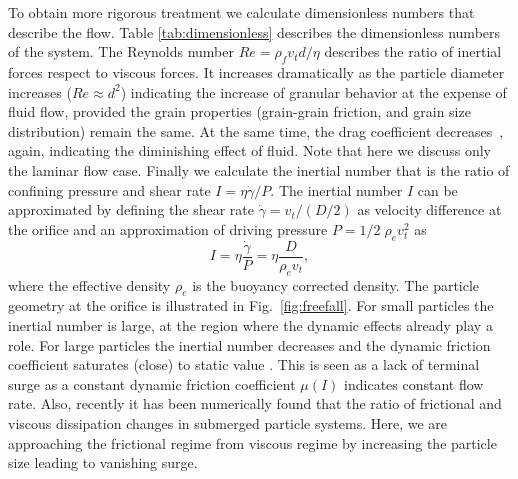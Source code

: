 \documentclass[twoside,twocolumn,9pt]{article}
\providecommand{\DIFadd}[1]{{\protect\color{blue}\uwave{#1}}} %
\providecommand{\DIFaddbegin}{} %
\providecommand{\DIFaddend}{} %
\providecommand{\DIFdelbegin}{} %
\newcommand{\DIFscaledelfig}{0.5}
\newlength{\DIFdelgraphicswidth} %
\newlength{\DIFdelgraphicsheight} %
\newcommand{\DIFaddincludegraphics}[2][]{{\color{blue}\fbox{\DIFOincludegraphics[#1]{#2}}}} %
\newcommand{\DIFdelincludegraphics}[2][]{%
\sbox{\DIFdelgraphicsbox}{\DIFOincludegraphics[#1]{#2}}%
\settoboxwidth{\DIFdelgraphicswidth}{\DIFdelgraphicsbox} %
\settoboxtotalheight{\DIFdelgraphicsheight}{\DIFdelgraphicsbox} %
\scalebox{\DIFscaledelfig}{%
\parbox[b]{\DIFdelgraphicswidth}{\usebox{\DIFdelgraphicsbox}\\[-\baselineskip] \rule{\DIFdelgraphicswidth}{0em}}\llap{\resizebox{\DIFdelgraphicswidth}{\DIFdelgraphicsheight}{%
\setlength{\unitlength}{\DIFdelgraphicswidth}%
\begin{picture}(1,1)%
\thicklines\linethickness{2pt} %
{\color[rgb]{1,0,0}\put(0,0){\framebox(1,1){}}}%
{\color[rgb]{1,0,0}\put(0,0){\line( 1,1){1}}}%
{\color[rgb]{1,0,0}\put(0,1){\line(1,-1){1}}}%
\end{picture}%
}\hspace*{3pt}}} %
} %
\DeclareRobustCommand{\DIFaddbegin}{\DIFOaddbegin \let\includegraphics\DIFaddincludegraphics} %
\DeclareRobustCommand{\DIFaddend}{\DIFOaddend \let\includegraphics\DIFOincludegraphics} %
\DeclareRobustCommand{\DIFdelbegin}{\DIFOdelbegin \let\includegraphics\DIFdelincludegraphics} %
\begin{document}
To obtain \DIFaddbegin \DIFadd{a }\DIFaddend more rigorous treatment we calculate dimensionless numbers that describe the flow.
Table \ref{tab:dimensionless} describes the dimensionless numbers of the system.
The Reynolds number $Re = \rho_f v_t d/\eta$ describes the ratio of inertial forces respect to viscous forces. 
It increases dramatically as the particle diameter increases ($Re \approx d^2$) indicating
the increase of granular behavior at the expense of fluid flow, provided the grain properties (grain-grain friction, and grain size distribution) remain the same.
At the same time, the drag coefficient decreases~\cite{Morrison2013Drag}, again, indicating 
the diminishing effect of fluid. Note that here we discuss only the laminar flow case.
Finally we calculate the inertial number that is the ratio of confining 
pressure and shear rate $I=\eta \dot{\gamma}/P$\DIFaddbegin \DIFadd{~~}\DIFaddend \cite{Houssais15NCO, Kamrin15SM}. 
The inertial number $I$ can be approximated by defining the shear rate 
$\dot{\gamma} = v_t/(D/2)$ as velocity difference at the orifice and an 
approximation of driving pressure $P = 1/2\;\rho_{e} v_t^2$
as
%
\begin{equation}
 I 	= \eta \frac{\dot{\gamma}}{P} = \eta \frac{D}{\rho_{e}v_t}, 
\end{equation}
%
\noindent where the effective density $\rho_{e}$ is the buoyancy 
corrected density. 
The particle geometry at the orifice is illustrated in Fig.~\ref{fig:freefall}.
For small particles the inertial number is large, at the region where the 
dynamic effects already play a role. For large particles 
the inertial number decreases and the dynamic friction coefficient 
saturates (close) to static value \cite{Singh15NJP}.
This is seen as a lack of terminal surge as a constant dynamic friction
coefficient $\mu(I)$ indicates constant flow rate. 
Also, recently \cite{Trulsson16PRE} it has been numerically found that the ratio of frictional and viscous dissipation changes in submerged particle systems. Here, we are approaching the frictional regime from viscous regime by increasing the particle size leading to vanishing surge. 
%
\DIFdelbegin %
\end{document}
